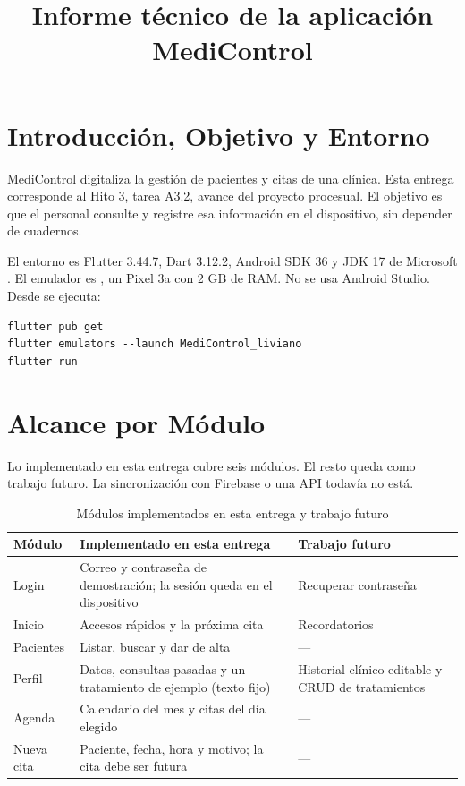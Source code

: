 \documentclass[stu,letterpaper,floatsintext,nolmodern,nofontenc]{apa7}
\title{Informe técnico de la aplicación MediControl}
\begin{document}
\maketitle

\section{Introducción, Objetivo y Entorno}

MediControl digitaliza la gestión de pacientes y citas de una clínica.
Esta entrega corresponde al Hito 3, tarea A3.2, avance del proyecto procesual.
El objetivo es que el personal consulte y registre esa información en el dispositivo, sin depender de cuadernos.

El entorno es Flutter 3.44.7, Dart 3.12.2, Android SDK 36 y JDK 17 de Microsoft \parencite{flutterDocs}.
El emulador es , un Pixel 3a con 2 GB de RAM.
No se usa Android Studio. Desde  se ejecuta:

{\linespread{1}\selectfont
\begin{lstlisting}[language={}]
flutter pub get
flutter emulators --launch MediControl_liviano
flutter run
\end{lstlisting}}

\section{Alcance por Módulo}

Lo implementado en esta entrega cubre seis módulos. El resto queda como trabajo futuro.
La sincronización con Firebase o una API todavía no está.

\begin{table}[H]
\caption{Módulos implementados en esta entrega y trabajo futuro}
\centering
{\linespread{1}\selectfont\footnotesize
\begin{tabular}{@{}>{\raggedright\arraybackslash}p{2.15cm}>{\raggedright\arraybackslash}p{6.7cm}>{\raggedright\arraybackslash}p{6.5cm}@{}}
\toprule
Módulo & Implementado en esta entrega & Trabajo futuro \\
\midrule
Login & Correo y contraseña de demostración; la sesión queda en el dispositivo & Recuperar contraseña \\
Inicio & Accesos rápidos y la próxima cita & Recordatorios \\
Pacientes & Listar, buscar y dar de alta & --- \\
Perfil & Datos, consultas pasadas y un tratamiento de ejemplo (texto fijo) & Historial clínico editable y CRUD de tratamientos \\
Agenda & Calendario del mes y citas del día elegido & --- \\
Nueva cita & Paciente, fecha, hora y motivo; la cita debe ser futura & --- \\
\bottomrule
\end{tabular}}
\end{table}
\end{document}
